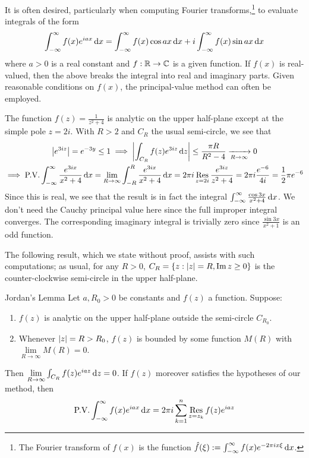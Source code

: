\goodbreak



It is often desired, particularly when computing Fourier transforms,\footnote{%
	The Fourier transform of $f(x)$ is the function $\hat f(\xi):=\int_{-\infty}^\infty f(x)e^{-2\pi ix\xi}\,{\mathrm{d} x}$.%
} to evaluate integrals of the form
\[
	\int_{-\infty}^\infty f(x)e^{i ax}\,{\mathrm{d} x}
	=\int_{-\infty}^\infty f(x)\cos ax\,{\mathrm{d} x}
	+i\int_{-\infty}^\infty f(x)\sin ax\,{\mathrm{d} x}
\]
where $a>0$ is a real constant and $f:\mathbb{R}\to\mathbb{C}$ is a given function. If $f(x)$ is real-valued, then the above breaks the integral into real and imaginary parts. Given reasonable conditions on $f(x)$, the principal-value method can often be employed.

\begin{example}{}{}
	The function $f(z)=\frac 1{z^2+4}$ is analytic on the upper half-plane except at the simple pole $z=2i$. With $R>2$ and $C_R$ the usual semi-circle, we see that
	\begin{gather*}
		\left| e^{3iz}\right|=e^{-3y}\le 1
		\implies \left| \int_{C_R}f(z)e^{3iz}\,{\mathrm{d} z}\right|
		\le \frac{\pi R}{R^2-4}\xrightarrow[R\to\infty]{} 0\\
		\implies \text{P.V.}\int_{-\infty}^\infty \frac{e^{3ix}}{x^2+4}\,{\mathrm{d} x} 
		=\lim_{R\to\infty}\int_{-R}^R \frac{e^{3ix}}{x^2+4}\,{\mathrm{d} x} 
		=2\pi i\operatorname*{Res}_{z=2i}\frac{e^{3iz}}{z^2+4} 
		=2\pi i\frac{e^{-6}}{4i} 
		=\frac 12\pi e^{-6}
	\end{gather*}
	Since this is real, we see that the result is in fact the integral $\int_{-\infty}^\infty \frac{\cos 3x}{x^2+4}\,{\mathrm{d} x}$. We don't need the Cauchy principal value here since the full improper integral converges. The corresponding imaginary integral is trivially zero since $\frac{\sin 3x}{x^2+1}$ is an odd function.
\end{example}

The following result, which we state without proof, assists with such computations; as usual, for any $R>0$, $C_R=\{z:\left| z\right|=R,\operatorname{Im} z\ge 0\}$ is the counter-clockwise semi-circle in the upper half-plane.

\begin{thm}{Jordan's Lemma}{}
	Let $a,R_0>0$ be constants and $f(z)$ a function. Suppose:
	\begin{enumerate}
	  \item $f(z)$ is analytic on the upper half-plane outside the semi-circle $C_{R_0}$.
	  \item Whenever $\left| z\right|=R>R_0$, $f(z)$ is bounded by some function $M(R)$ with $\lim\limits_{R\to\infty}M(R)=0$.
	\end{enumerate}
	Then $\lim\limits_{R\to\infty}\int_{C_R}f(z)e^{i az}\,{\mathrm{d} z}=0$. If $f(z)$ moreover satisfies the hypotheses of our method, then
	\[
		\text{P.V.}\int_{-\infty}^\infty f(x)e^{i ax}\,{\mathrm{d} x}
		=2\pi i\sum_{k=1}^n\operatorname*{Res}_{z=z_k}f(z)e^{i az}
	\]
\end{thm}

